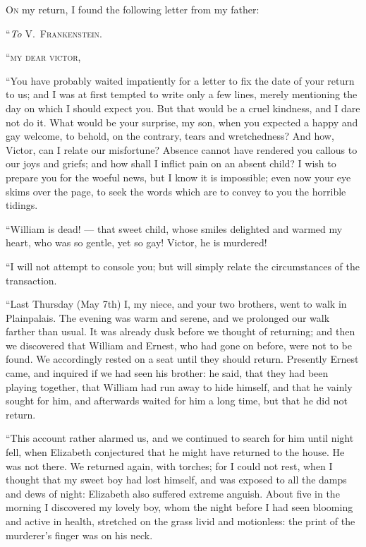 
\textsc{On} my return, I found the following
letter from my father:

\bigskip
\noindent ``\emph{To} V.~\textsc{Frankenstein}.

\medskip
\noindent ``\textsc{my dear victor},

\medskip
``You have probably waited impatiently
for a letter to fix the date of
your return to us; and I was at first
tempted to write only a few lines, merely
mentioning the day on which I should
expect you. But that would be a cruel
kindness, and I dare not do it. What
would be your surprise, my son, when
you expected a happy and gay welcome,
to behold, on the contrary, tears and
wretchedness? And how, Victor, can I
relate our misfortune? Absence cannot
have rendered you callous to our
joys and griefs; and how shall I inflict
pain on an absent child? I wish to prepare
you for the woeful news, but I
know it is impossible; even now your
eye skims over the page, to seek the
words which are to convey to you the
horrible tidings.

``William is dead! --- that sweet child,
whose smiles delighted and warmed
my heart, who was so gentle, yet so
gay! Victor, he is murdered!

``I will not attempt to console you;
but will simply relate the circumstances
of the transaction.

``Last Thursday (May 7th) I, my
niece, and your two brothers, went to
walk in Plainpalais. The evening was
warm and serene, and we prolonged
our walk farther than usual. It was
already dusk before we thought of returning;
and then we discovered that
William and Ernest, who had gone on
before, were not to be found. We accordingly
rested on a seat until they
should return. Presently Ernest came,
and inquired if we had seen his brother:
he said, that they had been playing
together, that William had run away
to hide himself, and that he vainly
sought for him, and afterwards waited
for him a long time, but that he did
not return.

``This account rather alarmed us,
and we continued to search for him
until night fell, when Elizabeth conjectured
that he might have returned to
the house. He was not there. We returned
again, with torches; for I could
not rest, when I thought that my sweet
boy had lost himself, and was exposed
to all the damps and dews of night:
Elizabeth also suffered extreme anguish.
About five in the morning I discovered
my lovely boy, whom the night before
I had seen blooming and active in
health, stretched on the grass livid and
motionless: the print of the murderer's
finger was on his neck.

